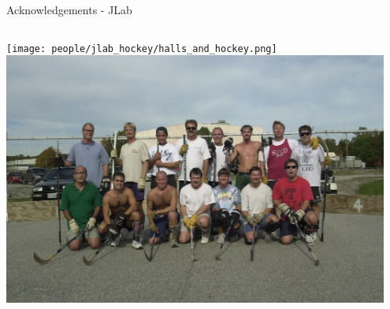 \documentclass[aspectratio=169]{beamer}
\begin{document}
\begin{frame}{Acknowledgements - JLab}

     \begin{columns}
            \centering
                \texttt{[image: people/jlab\_hockey/halls\_and\_hockey.png]}
                \includegraphics[width=0.95\textwidth]{people/jlab_hockey/JLab Hockey 2002.jpg}
    \end{columns}
    
\end{frame}
\end{document}
